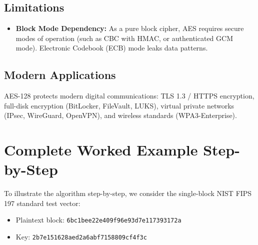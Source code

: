 \subsection{Limitations}
\begin{itemize}
    \item \textbf{Block Mode Dependency:} As a pure block cipher, AES requires secure modes of operation (such as CBC with HMAC, or authenticated GCM mode). Electronic Codebook (ECB) mode leaks data patterns.
\end{itemize}

\subsection{Modern Applications}
AES-128 protects modern digital communications: TLS 1.3 / HTTPS encryption, full-disk encryption (BitLocker, FileVault, LUKS), virtual private networks (IPsec, WireGuard, OpenVPN), and wireless standards (WPA3-Enterprise).

\section{Complete Worked Example Step-by-Step}
To illustrate the algorithm step-by-step, we consider the single-block NIST FIPS 197 standard test vector:
\begin{itemize}
    \item Plaintext block: \texttt{6bc1bee22e409f96e93d7e117393172a}
    \item Key: \texttt{2b7e151628aed2a6abf7158809cf4f3c}
\end{itemize}

